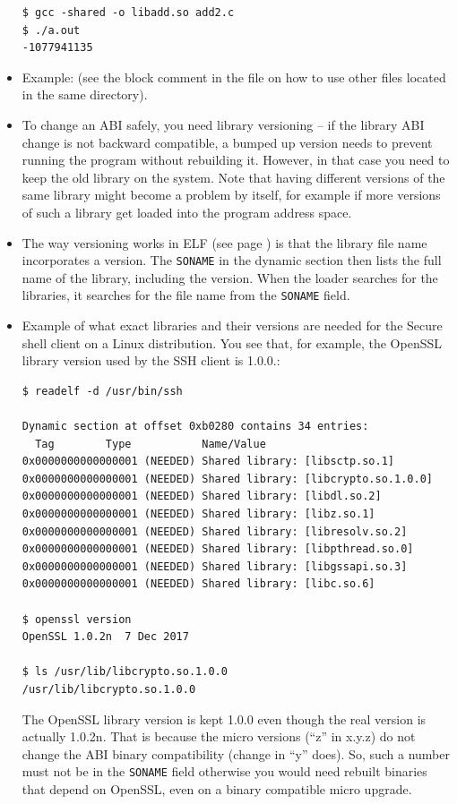 \begin{itemize}
\begin{verbatim}
$ gcc -shared -o libadd.so add2.c 
$ ./a.out 
-1077941135
\end{verbatim}

\item \label{ABI_MAIN} Example:  (see the block
comment in the file on how to use other files located in the same directory).
\item To change an ABI safely, you need library versioning -- if the library
ABI change is not backward compatible, a bumped up version needs to prevent
running the program without rebuilding it.   However, in that case you need to keep
the old library on the system.  Note that having different versions of the same
library might become a problem by itself, for example if more versions of such
a library get loaded into the program address space.
\item The way versioning works in ELF (see page \pageref{ELF}) is that the
library file name incorporates a version.  The \texttt{SONAME} in the dynamic
section then lists the full name of the library, including the version.  When
the loader searches for the libraries, it searches for the file name from the
\texttt{SONAME} field.
\item Example of what exact libraries and their versions are needed for the
Secure shell client on a Linux distribution.  You see that, for example, the
OpenSSL library version used by the SSH client is 1.0.0.:

\begin{verbatim}
$ readelf -d /usr/bin/ssh

Dynamic section at offset 0xb0280 contains 34 entries:
  Tag        Type           Name/Value
0x0000000000000001 (NEEDED) Shared library: [libsctp.so.1]
0x0000000000000001 (NEEDED) Shared library: [libcrypto.so.1.0.0]
0x0000000000000001 (NEEDED) Shared library: [libdl.so.2]
0x0000000000000001 (NEEDED) Shared library: [libz.so.1]
0x0000000000000001 (NEEDED) Shared library: [libresolv.so.2]
0x0000000000000001 (NEEDED) Shared library: [libpthread.so.0]
0x0000000000000001 (NEEDED) Shared library: [libgssapi.so.3]
0x0000000000000001 (NEEDED) Shared library: [libc.so.6]

$ openssl version
OpenSSL 1.0.2n  7 Dec 2017

$ ls /usr/lib/libcrypto.so.1.0.0
/usr/lib/libcrypto.so.1.0.0
\end{verbatim}

\par The OpenSSL library version is kept 1.0.0 even though the real version is
actually 1.0.2n.  That is because the micro versions (``z'' in x.y.z) do not
change the ABI binary compatibility (change in ``y'' does).  So, such a number
must not be in the \texttt{SONAME} field otherwise you would need rebuilt
binaries that depend on OpenSSL, even on a binary compatible micro upgrade.
\end{itemize}

